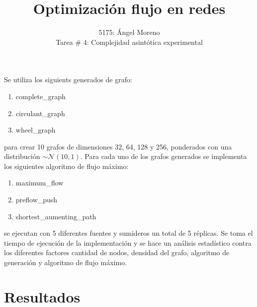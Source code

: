 \documentclass[12pt, a4paper]{article}
\author{5175: \'Angel Moreno \\ Tarea \# 4: Complejidad asintótica experimental}
\title{Optimizaci\'on flujo en redes}
\begin{document}
\maketitle

Se utiliza los siguients generados de grafo:
\begin{enumerate}
	\item complete\_graph
	\item circulant\_graph
	\item wheel\_graph
\end{enumerate}
para crear 10 grafos de dimensiones 32, 64, 128 y 256, ponderados con una distribuci\'on $\sim \mathcal{N}(10, 1)$. Para cada uno de los grafos generados se implementa los siguientes algoritmo de flujo m\'aximo:
\begin{enumerate}
	\item maximum\_flow
	\item preflow\_push
	\item shortest\_aumenting\_path
\end{enumerate}
se ejecutan con 5 diferentes fuentes y sumideros un total de 5 r\'eplicas. Se toma el tiempo de ejecuci\'on de la implementaci\'on y se hace un an\'alisis estad\'istico contra los diferentes factores cantidad de nodos, densidad del grafo, algoritmo de generaci\'on y algoritmo de flujo m\'aximo.

\section{Resultados}
\end{document}
